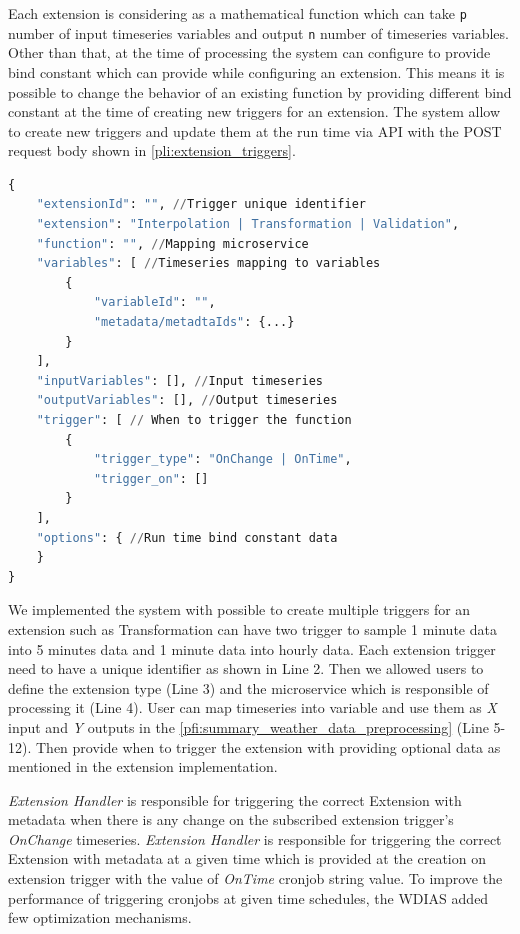 \documentclass[conference]{IEEEtran}
\begin{document}
Each extension is considering as a mathematical function which can take \texttt{p} number of input timeseries variables and output \texttt{n} number of timeseries variables. Other than that, at the time of processing the system can configure to provide bind constant which can provide while configuring an extension. This means it is possible to change the behavior of an existing function by providing different bind constant at the time of creating new triggers for an extension. The system allow to create new triggers and update them at the run time via API with the POST request body shown in \cref{pli:extension_triggers}.

\begin{lstlisting}[language=Python, caption=Update Extension Triggers API, label=pli:extension_triggers]
{
    "extensionId": "", //Trigger unique identifier
    "extension": "Interpolation | Transformation | Validation",
    "function": "", //Mapping microservice
    "variables": [ //Timeseries mapping to variables
        {
            "variableId": "",
            "metadata/metadtaIds": {...}
        }
    ],
    "inputVariables": [], //Input timeseries
    "outputVariables": [], //Output timeseries
    "trigger": [ // When to trigger the function
        {
            "trigger_type": "OnChange | OnTime",
            "trigger_on": []
        }
    ],
    "options": { //Run time bind constant data
    }
}
\end{lstlisting}

We implemented the system with possible to create multiple triggers for an extension such as Transformation can have two trigger to sample 1 minute data into 5 minutes data and 1 minute data into hourly data. Each extension trigger need to have a unique identifier as shown in Line 2. Then we allowed users to define the extension type (Line 3) and the microservice which is responsible of processing it (Line 4). User can map timeseries into variable and use them as \emph{X} input and \emph{Y} outputs in the \cref{pfi:summary_weather_data_preprocessing} (Line 5-12). Then provide when to trigger the extension with providing optional data as mentioned in the extension implementation.

\emph{Extension Handler} is responsible for triggering the correct Extension with metadata when there is any change on the subscribed extension trigger's \emph{OnChange} timeseries.
\emph{Extension Handler} is responsible for triggering the correct Extension with metadata at a given time which is provided at the creation on extension trigger with the value of \emph{OnTime} cronjob string value. To improve the performance of triggering cronjobs at given time schedules, the WDIAS added few optimization mechanisms.
\end{document}
